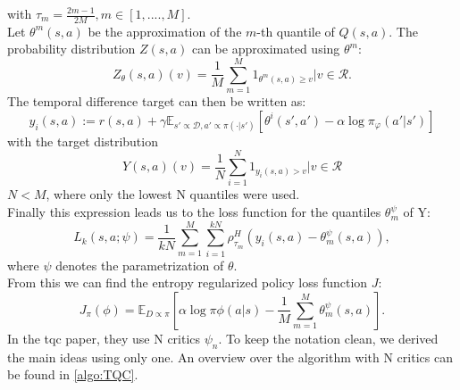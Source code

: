 with ${\tau_m = \frac{2m-1}{2M}}, m \in [1, ...., M]$.\\
Let $\theta^m(s,a)$ be the approximation of the $m$-th quantile of $Q(s,a)$. The probability distribution $Z(s,a)$ can be approximated using $\theta^m$:
\begin{equation}
    Z_{\theta}(s,a) (v) = \frac{1}{M} \sum_{m=1}^M 1_{\theta^m(s,a) \geq v} | v\in\mathcal{R}.
\end{equation}
The temporal difference target can then be written as:
\begin{equation}
    y_i(s,a) := r(s,a) + \gamma \mathbb{E}_{s' \propto \mathcal{D}, a' \propto \pi(\cdot|s')}[\theta^i(s',a') - \alpha \log \pi_{\varphi}(a'|s')]
\end{equation}
with the target distribution
\begin{equation}
    Y(s,a)(v) = \frac{1}{N} \sum_{i=1}^N 1_{y_i(s,a) > v} | v \in \mathcal{R}
\end{equation}
$N<M$, where only the lowest N quantiles were used. \\
Finally this expression leads us to the loss function for the quantiles $\theta_m^{\psi}$ of Y:
\begin{equation}
    L_k(s,a;\psi) = \frac{1}{kN}\sum_{m=1}^{M}\sum_{i=1}^{kN}\rho^H_{\tau_m} \left(y_i(s,a) - \theta_m^{\psi}(s,a)\right),
\end{equation}
where $\psi$ denotes the parametrization of $\theta$.\\
From this we can find the entropy regularized policy loss function $J$:
\begin{equation}
    J_\pi(\phi) = \mathbb{E}_{D \propto \pi}\left[\alpha\log\pi{\phi}(a|s) - \frac{1}{M}\sum_{m=1}^{M}\theta_m^{\psi}(s,a)\right].
\end{equation}
In the \ac{tqc} paper, they use N critics $\psi_n$. To keep the notation clean, we derived the main ideas using only one. An 
overview over the algorithm with N critics can be found in \ref{algo:TQC}.

